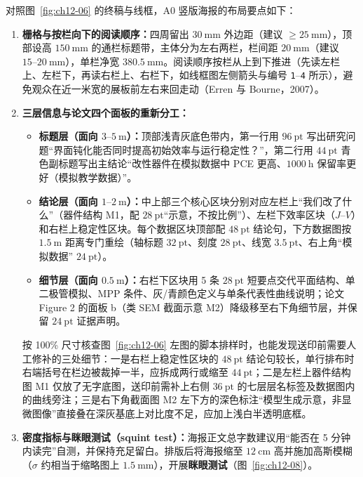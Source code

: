 对照图~\ref{fig:ch12-06} 的终稿与线框，A0 竖版海报的布局要点如下：
\begin{enumerate}
\item \textbf{栅格与按栏向下的阅读顺序：}四周留出 $30\ \text{mm}$ 外边距（建议 $\ge 25\ \text{mm}$），顶部设高 $150\ \text{mm}$ 的通栏标题带，主体分为左右两栏，栏间距 $20\ \text{mm}$（建议 $15\text{--}20\ \text{mm}$），单栏净宽 $380.5\ \text{mm}$。阅读顺序按栏从上到下推进（先读左栏上、左栏下，再读右栏上、右栏下，如线框图左侧箭头与编号 \texttt{1}--\texttt{4} 所示），避免观众在近一米宽的展板前左右来回走动（Erren 与 Bourne，2007）。
\item \textbf{三层信息与论文四个面板的重新分工：}
  \begin{itemize}
  \item \textbf{标题层（面向 $3\text{--}5\ \text{m}$）：}顶部浅青灰底色带内，第一行用 $96\ \text{pt}$ 写出研究问题“界面钝化能否同时提高初始效率与运行稳定性？”，第二行用 $44\ \text{pt}$ 青色副标题写出主结论“改性器件在模拟数据中 PCE 更高、$1000\ \text{h}$ 保留率更好（模拟教学数据）”。
  \item \textbf{结论层（面向 $1\text{--}2\ \text{m}$）：}中上部三个核心区块分别对应左栏上“我们改了什么”（器件结构 M1，配 $28\ \text{pt}$“示意，不按比例”）、左栏下效率区块（$J\text{--}V$）和右栏上稳定性区块。每个数据区块顶部配 $48\ \text{pt}$ 结论句，下方数据图按 $1.5\ \text{m}$ 距离专门重绘（轴标题 $32\ \text{pt}$、刻度 $28\ \text{pt}$、线宽 $3.5\ \text{pt}$、右上角“模拟数据” $24\ \text{pt}$）。
  \item \textbf{细节层（面向 $0.5\ \text{m}$）：}右栏下区块用 5 条 $28\ \text{pt}$ 短要点交代平面结构、单二极管模拟、MPP 条件、灰/青颜色定义与单条代表性曲线说明；论文 Figure 2 的面板 b（类 SEM 截面示意 M2）降级移至右下角细节层，并保留 $24\ \text{pt}$ 证据声明。
  \end{itemize}
  按 100\% 尺寸核查图~\ref{fig:ch12-06} 左图的脚本排样时，也能发现送印前需要人工修补的三处细节：一是右栏上稳定性区块的 $48\ \text{pt}$ 结论句较长，单行排布时右端括号在栏边被裁掉一半，应拆成两行或缩至 $44\ \text{pt}$；二是左栏上器件结构图 M1 仅放了无字底图，送印前需补上右侧 $36\ \text{pt}$ 的七层层名标签及数据图内的曲线旁注；三是右下角截面图 M2 左下方的深色标注“模型生成示意，非显微图像”直接叠在深灰基底上对比度不足，应加上浅白半透明底框。
\item \textbf{密度指标与眯眼测试（squint test）：}海报正文总字数建议用“能否在 5 分钟内读完”自测，并保持充足留白。排版后将海报缩至 $12\ \text{cm}$ 高并施加高斯模糊（$\sigma$ 约相当于缩略图上 $1.5\ \text{mm}$），开展\textbf{眯眼测试}（图~\ref{fig:ch12-08}）。
\end{enumerate}

